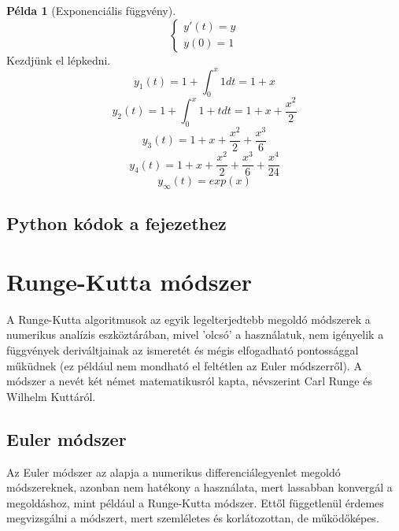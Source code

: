 \documentclass{article}
\theoremstyle{definition}
\theoremstyle{theorem}
\newtheorem{example}{Példa}
\begin{document}
\begin{example}[Exponenciális függvény]
\begin{equation*}
    \begin{cases}
       y'(t) = y\\
       y(0) = 1
    \end{cases}
\end{equation*}
Kezdjünk el lépkedni.
\begin{equation*}
    y_1(t) = 1 + \int_0^x 1 dt = 1 + x
\end{equation*}
\begin{equation*}
    y_2(t) = 1 + \int_0^x 1+t dt = 1 + x + \frac{x^2}{2}
\end{equation*}
\begin{equation*}
    y_3(t) =  1 + x + \frac{x^2}{2} + \frac{x^3}{6}
\end{equation*}
\begin{equation*}
    y_4(t) = 1 + x + \frac{x^2}{2} + \frac{x^3}{6} + \frac{x^4}{24}
\end{equation*}
\begin{equation*}
    y_{\infty}(t) = exp(x)
\end{equation*}
\end{example}
\subsection{Python kódok a fejezethez}

\section{Runge-Kutta módszer}
A Runge-Kutta algoritmusok az egyik legelterjedtebb megoldó módszerek a numerikus analízis eszköztárában, mivel 'olcsó' a használatuk, nem igényelik a függvények deriváltjainak az ismeretét és mégis elfogadható pontossággal műküdnek (ez például nem mondható el feltétlen az Euler módszerről). A módszer a nevét két német matematikusról kapta, névszerint Carl Runge és Wilhelm Kuttáról.

\subsection{Euler módszer}
Az Euler módszer az alapja a numerikus differenciálegyenlet megoldó módszereknek, azonban nem hatékony a használata, mert lassabban konvergál a megoldáshoz, mint például a Runge-Kutta módszer. Ettől függetlenül érdemes megvizsgálni a módszert, mert szemléletes és korlátozottan, de működőképes.
\end{document}
